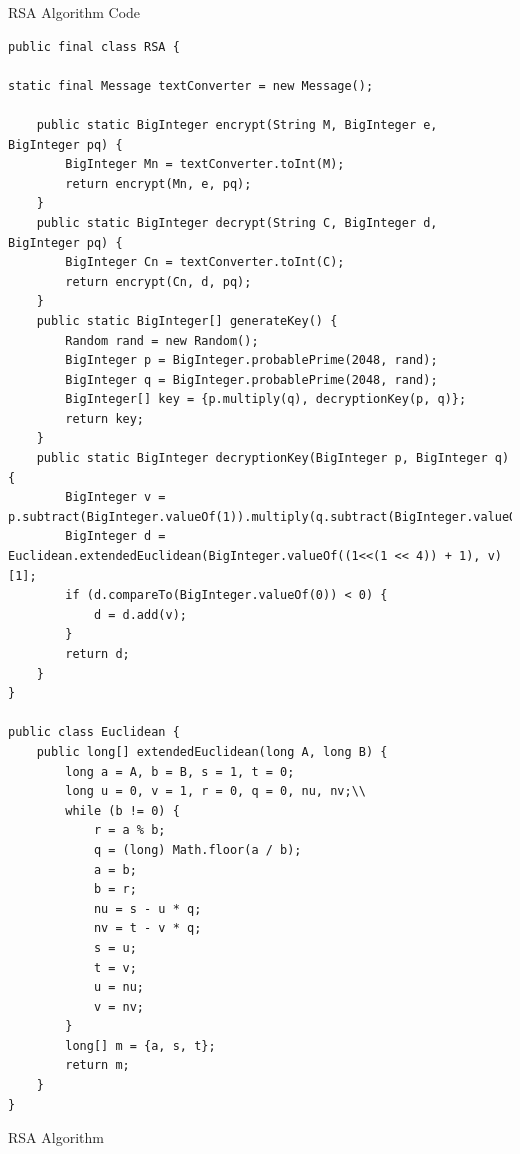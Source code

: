 \documentclass[landscape,fontscale=.4,paperwidth=48in,paperheight=36in]{baposter} %
\begin{document}
\begin{poster}
\begin{posterbox}[name=code,column=31,span=27,row=0]{RSA Algorithm Code}
{\begin{verbatim}
public final class RSA {

static final Message textConverter = new Message();

    public static BigInteger encrypt(String M, BigInteger e, BigInteger pq) {
        BigInteger Mn = textConverter.toInt(M);
        return encrypt(Mn, e, pq);
    }
    public static BigInteger decrypt(String C, BigInteger d, BigInteger pq) {
        BigInteger Cn = textConverter.toInt(C);
        return encrypt(Cn, d, pq);
    }
    public static BigInteger[] generateKey() {
        Random rand = new Random();
        BigInteger p = BigInteger.probablePrime(2048, rand);
        BigInteger q = BigInteger.probablePrime(2048, rand);
        BigInteger[] key = {p.multiply(q), decryptionKey(p, q)};
        return key;
    }
    public static BigInteger decryptionKey(BigInteger p, BigInteger q) {
        BigInteger v = p.subtract(BigInteger.valueOf(1)).multiply(q.subtract(BigInteger.valueOf(1)));
        BigInteger d = Euclidean.extendedEuclidean(BigInteger.valueOf((1<<(1 << 4)) + 1), v)[1];
        if (d.compareTo(BigInteger.valueOf(0)) < 0) {
            d = d.add(v);
        }
        return d;
    }
}

public class Euclidean {
    public long[] extendedEuclidean(long A, long B) {
        long a = A, b = B, s = 1, t = 0;
        long u = 0, v = 1, r = 0, q = 0, nu, nv;\\
        while (b != 0) {
            r = a % b;
            q = (long) Math.floor(a / b);
            a = b;
            b = r;
            nu = s - u * q;
            nv = t - v * q;
            s = u;
            t = v;
            u = nu;
            v = nv;
        }
        long[] m = {a, s, t};
        return m;
    }
}
\end{verbatim}}

\end{posterbox}











\begin{posterbox}[name=rsa,column=13,row=0,span=17]{RSA Algorithm} %


\end{posterbox}
\end{poster}
\end{document}
